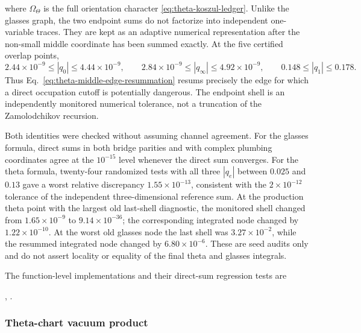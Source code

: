 \documentclass[11pt]{article}
\begin{document}
where \(\Omega_\Theta\) is the full orientation character
\eqref{eq:theta-koszul-ledger}.  Unlike the glasses graph, the two endpoint
sums do not factorize into independent one-variable traces.  They are kept as
an adaptive numerical representation after the non-small middle coordinate
has been summed exactly.  At the five certified overlap points,
\begin{equation}
 2.44\times10^{-9}\leq |q_0|\leq4.44\times10^{-9},
 \qquad
 2.84\times10^{-9}\leq |q_\infty|\leq4.92\times10^{-9},
 \qquad
 0.148\leq|q_1|\leq0.178.
 \label{eq:theta-resummation-nome-ranges}
\end{equation}
Thus Eq.~\eqref{eq:theta-middle-edge-resummation} resums precisely the edge
for which a direct occupation cutoff is potentially dangerous.  The endpoint
shell is an independently monitored numerical tolerance, not a truncation of
the Zamolodchikov recursion.

Both identities were checked without assuming channel agreement.  For the
glasses formula, direct sums in both bridge parities and with complex plumbing
coordinates agree at the \(10^{-15}\) level whenever the direct sum converges.
For the theta formula, twenty-four randomized tests with all three
\(|q_e|\) between \(0.025\) and \(0.13\) gave a worst relative discrepancy
\(1.55\times10^{-13}\), consistent with the \(2\times10^{-12}\) tolerance of
the independent three-dimensional reference sum.  At the production theta
point with the largest old last-shell diagnostic, the monitored shell changed
from \(1.65\times10^{-9}\) to \(9.14\times10^{-36}\); the corresponding
integrated node changed by \(1.22\times10^{-10}\).  At the worst old glasses
node the last shell was \(3.27\times10^{-2}\), while the resummed integrated
node changed by \(6.80\times10^{-6}\).  These are seed audits only and do not
assert locality or equality of the final theta and glasses integrals.

The function-level implementations and their direct-sum regression tests are
\begin{center}
 ,\qquad
 .
\end{center}

\subsubsection{Theta-chart vacuum product}
\end{document}

